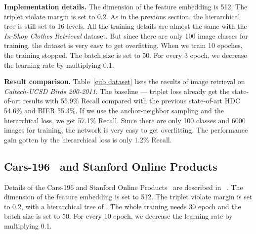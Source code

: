 \documentclass[runningheads]{llncs}
\begin{document}
\noindent\textbf{Implementation details.} The dimension  of the feature embedding is 512. The triplet violate margin is set to 0.2. As in the previous section, the hierarchical tree is still set to 16 levels. All the training details are almost the same with the \emph{In-Shop Clothes Retrieval} dataset. But since there are only 100 image classes for training, the dataset is very easy to get overfitting. When we train 10 epoches, the training stopped. The batch size is set to 50. For every 3 epoch, we decrease the learning rate by multiplying 0.1.

\noindent\textbf{Result comparison.} Table~\ref{cub dataset} lists the results of image retrieval on \emph{Caltech-UCSD Birds 200-2011}. The baseline --- triplet loss already get the state-of-art results with 55.9\% Recall compared with the previous state-of-art HDC 54.6\% and BIER 55.3\%. If we use the anchor-neighbor sampling and the hierarchical loss, we get 57.1\% Recall. Since there are only 100 classes and 6000 images for training, the network is very easy to get overfitting. The performance gain gotten by the hierarchical loss is only 1.2\% Recall.

\subsection{Cars-196~\cite{Krause2013} and Stanford Online Products~\cite{song2016deep}}\vspace{-2mm}
Details of the Cars-196 and Stanford Online Products~\cite{song2016deep} are described in ~\cite{Krause2013,song2016deep}. The dimension of the feature embedding is set to 512. The triplet violate margin is set to 0.2, with a hierarchical tree of . The whole training needs 30 epoch and the batch size is set to 50. For every 10 epoch, we decrease the learning rate by multiplying 0.1.
\end{document}
